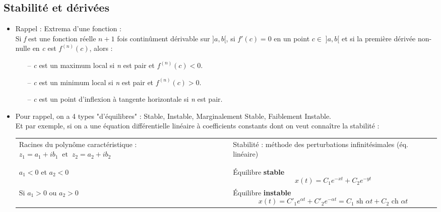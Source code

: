 \documentclass[a4paper]{article}
\begin{document}
\subsection{Stabilité et dérivées}





\begin{itemize}





\item Rappel : Extrema d'une fonction : \\
Si \emph{f} est une fonction réelle $ n + 1 $ fois continûment dérivable sur $ ]a, b[ $, si $ f'(c) = 0 $ en un point $ c \in \; ]a, b[ $ et si la première dérivée non-nulle en \emph{c} est $ f^{(n)} (c) $, alors : 
\begin{itemize}
\item[--] \emph{c} est un maximum local si \emph{n} est pair et $ f^{(n)}(c) < 0 $.
\item[--] \emph{c} est un minimum local si \emph{n} est pair et $ f^{(n)}(c) > 0 $.
\item[--] \emph{c} est un point d'inflexion à tangente horizontale si \emph{n} est pair.
\end{itemize}





\item Pour rappel, on a 4 types "d'équilibres" : Stable, Instable, Marginalement Stable, Faiblement Instable. \\
Et par exemple, si on a une équation différentielle linéaire à coefficients constants dont on veut connaître la stabilité : 

\begin{center} \begin{tabular}{p{6cm}|p{6cm}}

    Racines du polynôme caractéristique : $ z_1 = a_1 + i b_1 \; \; \text{et} \; \; z_2 = a_2 + i b_2 $ & Stabilité : méthode des perturbations infinitésimales (éq. linéaire)
    \\ & \\ \hline & \\

    $ a_1 < 0 $ et $ a_2 < 0 $ & Équilibre \textbf{stable}
    \[ x(t) = C_1 e^{- x t} + C_2 e^{- y t} \] \\

    Si $ a_1 > 0 $ ou $ a_2 > 0 $ & Équilibre \textbf{instable}
    \[ x(t) = C'_1 e^{\alpha t} + C'_2 e^{- \alpha t} = C_1 \text{ sh } \alpha t + C_2 \text{ ch } \alpha t \] \\


\end{tabular}
\end{center}
\end{itemize}
\end{document}
